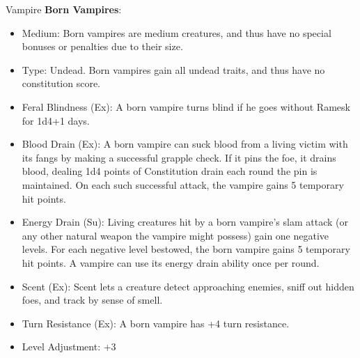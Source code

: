 \begin{35e}{Vampire}
  \textbf{Born Vampires}:\\
  \begin{itemize}[noitemsep]
    \item Medium: Born vampires are medium creatures, and thus have no special
      bonuses or penalties due to their size.
    \item Type: Undead. Born vampires gain all undead traits, and thus have no
      constitution score.
    \item Feral Blindness (Ex): A born vampire turns blind if he goes without
      Ramesk for 1d4+1 days.
    \item Blood Drain (Ex): A born vampire can suck blood from a living victim
      with its fangs by making a successful grapple check. If it pins the foe,
      it drains blood, dealing 1d4 points of Constitution drain each round the
      pin is maintained. On each such successful attack, the vampire gains 5
      temporary hit points.
    \item Energy Drain (Su): Living creatures hit by a born vampire's slam
      attack (or any other natural weapon the vampire might possess) gain one
      negative levels. For each negative level bestowed, the born vampire
      gains 5 temporary hit points. A vampire can use its energy drain ability
      once per round.
    \item Scent (Ex): Scent lets a creature detect approaching enemies, sniff
      out hidden foes, and track by sense of smell.
    \item Turn Resistance (Ex): A born vampire has +4 turn resistance.
    \item Level Adjustment: +3
  \end{itemize}
\end{35e}
